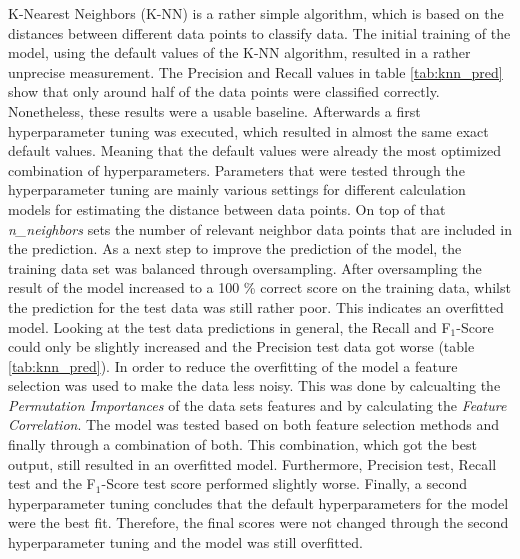 K-Nearest Neighbors (K-NN) is a rather simple algorithm, which is based on the distances between different data points to classify data. \citep{Yildirim2020} %
The initial training of the model, using the default values of the K-NN algorithm, resulted in a rather unprecise measurement. The Precision and Recall values in table \ref{tab:knn_pred} show that only around half of the data points were classified correctly. %
Nonetheless, these results were a usable baseline. Afterwards a first hyperparameter tuning was executed, which resulted in almost the same exact default values. Meaning that the default values were already the most optimized combination of hyperparameters. Parameters that were tested through the hyperparameter tuning are mainly various settings for different calculation models for estimating the distance between data points. On top of that \textit{n\_neighbors} sets the number of relevant neighbor data points that are included in the prediction.
As a next step to improve the prediction of the model, the training data set was balanced through oversampling. After oversampling the result of the model increased to a 100 \% correct score on the training data, whilst the prediction for the test data was still rather poor. This indicates an overfitted model. Looking at the test data predictions in general, the Recall and F$_1$-Score could only be slightly increased and the Precision test data got worse (table \ref{tab:knn_pred}). %
In order to reduce the overfitting of the model a feature selection was used to make the data less noisy. This was done by calcualting the \textit{Permutation Importances} of the data sets features and by calculating the \textit{Feature Correlation}. The model was tested based on both feature selection methods and finally through a combination of both. This combination, which got the best output, still resulted in an overfitted model. Furthermore, Precision test, Recall test and the F$_1$-Score test score performed slightly worse. %
Finally, a second hyperparameter tuning concludes that the default hyperparameters for the model were the best fit. Therefore, the final scores were not changed through the second hyperparameter tuning and the model was still overfitted. %


